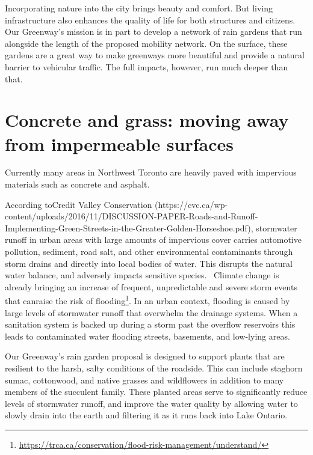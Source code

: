\documentclass[letter]{ourGreenwayBrand}
\begin{document}
\MakeBrandTitle

Incorporating nature into the city brings beauty and comfort. But living infrastructure also enhances the quality of life for both structures and citizens. Our Greenway’s mission is in part to develop a network of rain gardens that run alongside the length of the proposed mobility network. On the surface, these gardens are a great way to make greenways more beautiful and provide a natural barrier to vehicular traffic. The full impacts, however, run much deeper than that.

\section{Concrete and grass: moving away from impermeable surfaces}
Currently many areas in Northwest Toronto are heavily paved with impervious materials such as concrete and asphalt.

According toCredit Valley Conservation (https://cvc.ca/wp-content/uploads/2016/11/DISCUSSION-PAPER-Roads-and-Runoff-Implementing-Green-Streets-in-the-Greater-Golden-Horseshoe.pdf), stormwater runoff in urban areas with large amounts of impervious cover carries automotive pollution, sediment, road salt, and other environmental contaminants through storm drains and directly into local bodies of water. This disrupts the natural water balance, and adversely impacts sensitive species.  Climate change is already bringing an increase of frequent, unpredictable and severe storm events that canraise the risk of flooding\footnote{\url{https://trca.ca/conservation/flood-risk-management/understand/}}. In an urban context, flooding is caused by large levels of stormwater runoff that overwhelm the drainage systems. When a sanitation system is backed up during a storm past the overflow reservoirs this leads to contaminated water flooding streets, basements, and low-lying areas.

Our Greenway’s rain garden proposal is designed to support plants that are resilient to the harsh, salty conditions of the roadside. This can include staghorn sumac, cottonwood, and native grasses and wildflowers in addition to many members of the succulent family. These planted areas serve to significantly reduce levels of stormwater runoff, and improve the water quality by allowing water to slowly drain into the earth and filtering it as it runs back into Lake Ontario.
\end{document}

